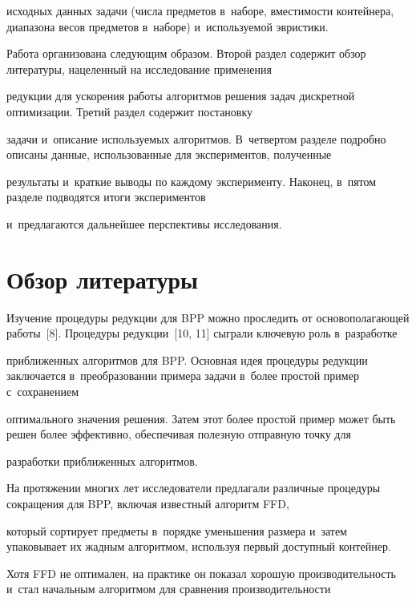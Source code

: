 исходных данных задачи (чис\-ла предметов в~наборе, вмес\-ти\-мости контейнера, диапазона весов предметов в~наборе) и~ис\-поль\-зу\-емой эври\-стики.





Работа организована следующим образом. Второй раздел содержит обзор литературы, нацеленный на исследование применения 

редукции для ускорения работы алгоритмов решения задач дис\-крет\-ной оптимизации. Третий раз\-дел содержит по\-ста\-нов\-ку 

задачи и~описание ис\-поль\-зу\-емых алгоритмов. В~четвертом разделе по\-дроб\-но описаны данные, использованные для экспериментов, полученные 

результаты и~крат\-кие выводы по каж\-до\-му эксперименту. Наконец, в~пятом разделе подводятся итоги экспериментов 

и~предлагаются дальнейшее перспективы исследования.



\section{Обзор литературы}



Изучение процедуры редукции для BPP можно проследить от осно\-во\-по\-ла\-га\-ющей работы~[8]. Процедуры редукции~[10, 11] сыгра\-ли ключевую роль в~разработке

 при\-бли\-жен\-ных алгоритмов для BPP. Основная идея процедуры редукции заключается в~преобразовании примера задачи в~более прос\-той пример с~сохранением 

 оптимального значения решения. Затем этот более прос\-той пример может быть решен более эффективно, обеспечивая полезную от\-прав\-ную точку для 

 разработки при\-бли\-жен\-ных алгоритмов.



На протяжении многих лет исследователи предлагали различные процедуры сокращения для BPP, вклю\-чая известный алгоритм FFD, 

который сортирует предметы в~порядке уменьшения размера и~затем упаковывает их жадным алгоритмом, используя пер\-вый доступный контейнер. 

Хотя FFD не оптимален, на практике он показал хорошую про\-из\-во\-ди\-тель\-ность и~стал начальным алгоритмом для срав\-не\-ния про\-из\-во\-ди\-тель\-ности 

